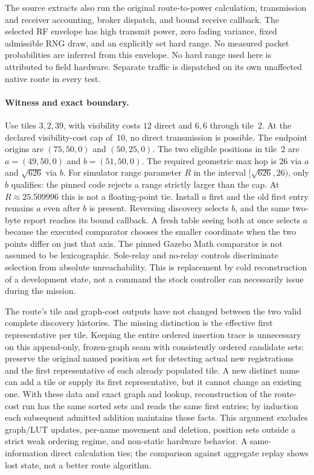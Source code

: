 \documentclass{article}
\begin{document}
The source extracts also run the original route-to-power calculation,
transmission and receiver accounting, broker dispatch, and bound
receive callback. The selected RF envelope has high transmit power,
zero fading variance, fixed admissible RNG draw, and an explicitly
set hard range. No measured packet probabilities are inferred from
this envelope. No hard range used here is attributed to field
hardware. Separate traffic is dispatched on its own unaffected
native route in every test.

\paragraph{Witness and exact boundary.}
Use tiles $3,2,39$, with visibility costs $12$ direct and $6,6$
through tile~2. At the declared visibility-cost cap of~10, no
direct transmission is possible. The endpoint origins are
$(75,50,0)$ and $(50,25,0)$. The two eligible positions in tile~2
are $a=(49,50,0)$ and $b=(51,50,0)$. The required geometric max hop
is $26$ via $a$ and $\sqrt{626}$ via $b$. For simulator range
parameter $R$ in the interval $[\sqrt{626},26)$, only $b$ qualifies:
the pinned code rejects a range strictly larger than the cap. At
$R\approx25.509996$ this is not a floating-point tie. Install $a$
first and the old first entry remains $a$ even after $b$ is present.
Reversing discovery selects $b$, and the same two-byte report reaches
its bound callback. A fresh table seeing both at once selects $a$
because the executed comparator chooses the smaller coordinate
when the two points differ on just that axis. The pinned
Gazebo Math comparator is not assumed to be lexicographic. Sole-relay and no-relay controls discriminate selection
from absolute unreachability. This is replacement by cold
reconstruction of a development state, not a command the stock
controller can necessarily issue during the mission.

The route's tile and graph-cost outputs have not changed between the
two valid complete discovery histories. The missing distinction is
the effective first representative per tile. Keeping the entire
ordered insertion trace is unnecessary on this append-only,
frozen-graph seam with consistently ordered candidate sets: preserve the original named position set for
detecting actual new registrations and the first representative
of each already populated tile. A new distinct name can add a tile
or supply its first representative, but it cannot change an existing
one. With these data and exact graph and lookup, reconstruction of
the route-cost run has the same sorted sets and reads the same
first entries; by induction each subsequent admitted addition
maintains those facts. This argument excludes graph/LUT updates,
per-name movement and deletion, position sets outside a strict weak ordering regime,
and non-static hardware behavior. A same-information direct
calculation ties; the comparison against aggregate replay shows lost
state, not a better route algorithm.
\end{document}
